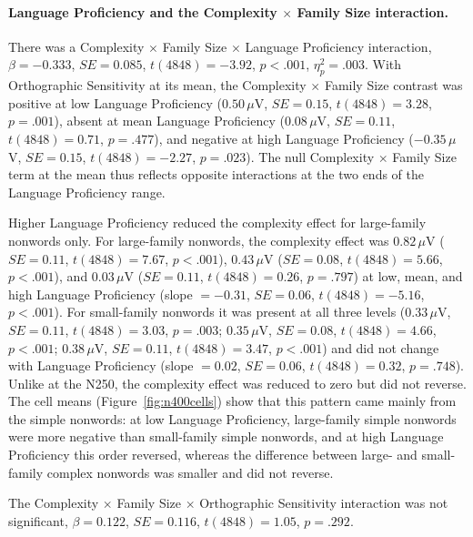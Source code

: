 \paragraph*{Language Proficiency and the Complexity $\times$ Family Size interaction.} There was a Complexity $\times$ Family Size $\times$ Language Proficiency interaction, $\beta = -0.333$, $SE = 0.085$, $t(4848) = -3.92$, $p < .001$, $\eta^2_p = .003$. With Orthographic Sensitivity at its mean, the Complexity $\times$ Family Size contrast was positive at low Language Proficiency ($0.50\,\mu$V, $SE = 0.15$, $t(4848) = 3.28$, $p = .001$), absent at mean Language Proficiency ($0.08\,\mu$V, $SE = 0.11$, $t(4848) = 0.71$, $p = .477$), and negative at high Language Proficiency ($-0.35\,\mu$V, $SE = 0.15$, $t(4848) = -2.27$, $p = .023$). The null Complexity $\times$ Family Size term at the mean thus reflects opposite interactions at the two ends of the Language Proficiency range.

Higher Language Proficiency reduced the complexity effect for large-family nonwords only. For large-family nonwords, the complexity effect was $0.82\,\mu$V ($SE = 0.11$, $t(4848) = 7.67$, $p < .001$), $0.43\,\mu$V ($SE = 0.08$, $t(4848) = 5.66$, $p < .001$), and $0.03\,\mu$V ($SE = 0.11$, $t(4848) = 0.26$, $p = .797$) at low, mean, and high Language Proficiency (slope $= -0.31$, $SE = 0.06$, $t(4848) = -5.16$, $p < .001$). For small-family nonwords it was present at all three levels ($0.33\,\mu$V, $SE = 0.11$, $t(4848) = 3.03$, $p = .003$; $0.35\,\mu$V, $SE = 0.08$, $t(4848) = 4.66$, $p < .001$; $0.38\,\mu$V, $SE = 0.11$, $t(4848) = 3.47$, $p < .001$) and did not change with Language Proficiency (slope $= 0.02$, $SE = 0.06$, $t(4848) = 0.32$, $p = .748$). Unlike at the N250, the complexity effect was reduced to zero but did not reverse. The cell means (Figure~\ref{fig:n400cells}) show that this pattern came mainly from the simple nonwords: at low Language Proficiency, large-family simple nonwords were more negative than small-family simple nonwords, and at high Language Proficiency this order reversed, whereas the difference between large- and small-family complex nonwords was smaller and did not reverse.

The Complexity $\times$ Family Size $\times$ Orthographic Sensitivity interaction was not significant, $\beta = 0.122$, $SE = 0.116$, $t(4848) = 1.05$, $p = .292$.


